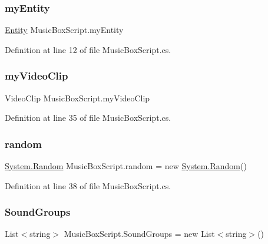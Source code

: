 \subsubsection{\texorpdfstring{myEntity}{myEntity}}
{\footnotesize\ttfamily \mbox{\hyperlink{_the_01_restless_01_curse_2_config_2_localization_8txt_a831452d5736d8c492ddd792b09c12cde}{Entity}} Music\+Box\+Script.\+my\+Entity}



Definition at line 12 of file Music\+Box\+Script.\+cs.

\mbox{\label{class_music_box_script_a61172a8ddeb5c7751108c81f9af5cd7d}} 
\subsubsection{\texorpdfstring{myVideoClip}{myVideoClip}}
{\footnotesize\ttfamily Video\+Clip Music\+Box\+Script.\+my\+Video\+Clip}



Definition at line 35 of file Music\+Box\+Script.\+cs.

\mbox{\label{class_music_box_script_ac1f77382b99a71d871c20be7987ca491}} 
\subsubsection{\texorpdfstring{random}{random}}
{\footnotesize\ttfamily \mbox{\hyperlink{_winter_mod_prefab_8cs_a24953b19d956caa76c403684c71b4e5b}{System.\+Random}} Music\+Box\+Script.\+random = new \mbox{\hyperlink{_winter_mod_prefab_8cs_a24953b19d956caa76c403684c71b4e5b}{System.\+Random}}()}



Definition at line 38 of file Music\+Box\+Script.\+cs.

\mbox{\label{class_music_box_script_ad24ee7923c7a633fc881d2f11e8f227d}} 
\subsubsection{\texorpdfstring{SoundGroups}{SoundGroups}}
{\footnotesize\ttfamily List$<$string$>$ Music\+Box\+Script.\+Sound\+Groups = new List$<$string$>$()}



